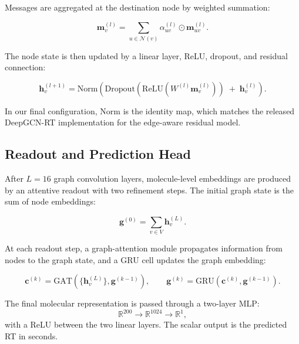 Messages are aggregated at the destination node by weighted summation:

\begin{equation}
    \mathbf{m}^{(l)}_v =
    \sum\limits_{u \in \mathcal{N}(v)}
    \alpha^{(l)}_{uv} \odot \mathbf{m}^{(l)}_{uv} .
\end{equation}

The node state is then updated by a linear layer, ReLU, dropout, and residual connection:

\begin{equation}
    \mathbf{h}^{(l+1)}_v =
    \mathrm{Norm}
    \left(
    \mathrm{Dropout}
    \left(
        \mathrm{ReLU}
        \left(
            W^{(l)} \mathbf{m}^{(l)}_v
            \right)
        \right)
    \;+\;
    \mathbf{h}^{(l)}_v
    \right).
\end{equation}

In our final configuration, \(\mathrm{Norm}\) is the identity map, which matches the released DeepGCN-RT implementation for the edge-aware residual model.

\subsection{Readout and Prediction Head}

After \(L=16\) graph convolution layers, molecule-level embeddings are produced by an attentive readout with two refinement steps. The initial graph state is the sum of node embeddings:

\begin{equation}
    \mathbf{g}^{(0)} = \sum_{v \in V} \mathbf{h}^{(L)}_v .
\end{equation}

At each readout step, a graph-attention module propagates information from nodes to the graph state, and a GRU cell updates the graph embedding:

\begin{equation}
    \mathbf{c}^{(k)} = \mathrm{GAT}\!\left(\{\mathbf{h}^{(L)}_v\}, \mathbf{g}^{(k-1)}\right),
    \qquad
    \mathbf{g}^{(k)} = \mathrm{GRU}\!\left(\mathbf{c}^{(k)}, \mathbf{g}^{(k-1)}\right).
\end{equation}

The final molecular representation is passed through a two-layer MLP:
\[
    \mathbb{R}^{200} \rightarrow \mathbb{R}^{1024} \rightarrow \mathbb{R}^{1},
\]
with a ReLU between the two linear layers. The scalar output is the predicted RT in seconds.

